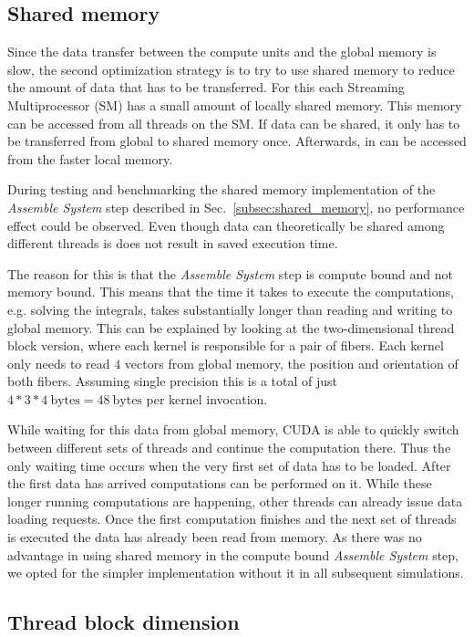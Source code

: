 \subsection{Shared memory}
\label{subsec:bench_shared_memory}

Since the data transfer between the compute units and the global memory is slow, the second optimization strategy is to try to use shared memory to reduce the amount of data that has to be transferred. For this each Streaming Multiprocessor (SM) has a small amount of locally shared memory. This memory can be accessed from all threads on the SM. If data can be shared, it only has to be transferred from global to shared memory once. Afterwards, in can be accessed from the faster local memory.

During testing and benchmarking the shared memory implementation of the \emph{Assemble System} step described in Sec.~\ref{subsec:shared_memory}, no performance effect could be observed. Even though data can theoretically be shared among different threads is does not result in saved execution time.

The reason for this is that the \emph{Assemble System} step is compute bound and not memory bound. This means that the time it takes to execute the computations, e.g. solving the integrals, takes substantially longer than reading and writing to global memory. This can be explained by looking at the two-dimensional thread block version, where each kernel is responsible for a pair of fibers. Each kernel only needs to read $4$ vectors from global memory, the position and orientation of both fibers. Assuming single precision this is a total of just $4 * 3 * 4~\text{bytes} = 48~\text{bytes}$ per kernel invocation.

While waiting for this data from global memory, CUDA is able to quickly switch between different sets of threads and continue the computation there. Thus the only waiting time occurs when the very first set of data has to be loaded. After the first data has arrived computations can be performed on it. While these longer running computations are happening, other threads can already issue data loading requests. Once the first computation finishes and the next set of threads is executed the data has already been read from memory. As there was no advantage in using shared memory in the compute bound \emph{Assemble System} step, we opted for the simpler implementation without it in all subsequent simulations.

\subsection{Thread block dimension}
\label{subsec:bench_thread_block}

